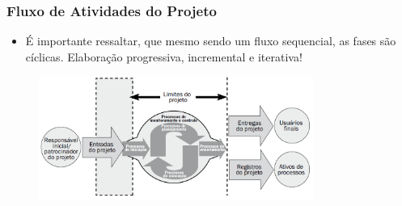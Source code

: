     \begin{frame}
   \frametitle{Fluxo de Atividades do Projeto}
  
   \begin{itemize}
    \item É importante ressaltar, que mesmo sendo um fluxo sequencial, as fases são cíclicas. Elaboração progressiva, incremental e iterativa!
   \end{itemize}

    \begin{figure}
  \centering
  \includegraphics[width = 0.8\textwidth]{figs/fig1_8.png}
 \end{figure}
  \end{frame}
  

